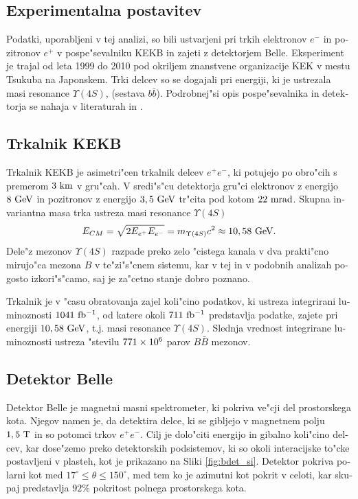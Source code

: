 \begin{otherlanguage}{slovene}
\section{Experimentalna postavitev}

Podatki, uporabljeni v tej analizi, so bili ustvarjeni pri trkih elektronov $e^-$ in pozitronov $e^+$ v pospe"sevalniku KEKB in zajeti z detektorjem Belle. Eksperiment je trajal od leta 1999 do 2010 pod okriljem znanstvene organizacije KEK v mestu Tsukuba na Japonskem. Trki delcev so se dogajali pri energiji, ki je ustrezala masi resonance $\Upsilon(4S)$, (sestava $b \bar b$). Podrobnej"si opis pospe"sevalnika in detektorja se nahaja v literaturah \cite{doi:10.1093/ptep/pts102} in \cite{ABASHIAN2002117}.

\subsection{Trkalnik KEKB}
Trkalnik KEKB je asimetri"cen trkalnik delcev $e^+e^-$, ki potujejo po obro"cih s premerom $3\mathrm{~km}$ v gru"cah. V sredi"s"cu detektorja gru"ci elektronov z energijo $8\mathrm{~GeV}$ in pozitronov z energijo $3,5\mathrm{~GeV}$ tr"cita pod kotom $22\mathrm{~mrad}$. Skupna invariantna masa trka ustreza masi resonance $\Upsilon(4S)$ 
\begin{equation}
E_{CM} = \sqrt{2E_{e^+}E_{e^-}} = m_{\Upsilon(4S)}c^2 \approx 10,58\mathrm{~GeV}.
\end{equation}
Dele"z mezonov $\Upsilon(4S)$ razpade preko zelo "cistega kanala v dva prakti"cno mirujo"ca mezona $B$ v te"zi"s"cnem sistemu, kar v tej in v podobnih analizah pogosto izkori"s"camo, saj je za"cetno stanje dobro poznano.

Trkalnik je v "casu obratovanja zajel koli"cino podatkov, ki ustreza integrirani luminoznosti $1041\mathrm{~fb^{-1}}$, od katere okoli $711\mathrm{~fb^{-1}}$ predstavlja podatke, zajete pri energiji $10,58\mathrm{~GeV}$, t.j. masi resonance $\Upsilon(4S)$. Slednja vrednost integrirane luminoznosti ustreza "stevilu $771\times 10^{6}$ parov $B \bar B$ mezonov.

\subsection{Detektor Belle}
Detektor Belle je magnetni masni spektrometer, ki pokriva ve"cji del prostorskega kota. Njegov namen je, da detektira delce, ki se gibljejo v magnetnem polju $1,5\mathrm{~T}$ in so potomci trkov $e^+e^-$. Cilj je dolo"citi energijo in gibalno koli"cino delcev, kar dose"zemo preko detektorskih podsistemov, ki so okoli interacijske to"cke postavljeni v plasteh, kot je prikazano na Sliki \ref{fig:bdet_si}. Detektor pokriva polarni kot med $17^\circ \leq \theta \leq 150^\circ$, med tem ko je azimutni kot pokrit v celoti, kar skupaj predstavlja $92\%$ pokritost polnega prostorskega kota.


\end{otherlanguage}
